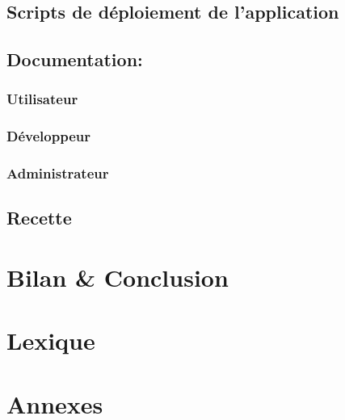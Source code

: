 \documentclass[11pt,a4paper]{report}
\begin{document}
	\section{Scripts de déploiement de l'application}
	\section{Documentation:}
		\subsection{Utilisateur}
		\subsection{Développeur}
		\subsection{Administrateur}
	\section{Recette}

\chapter{Bilan \& Conclusion}

\chapter*{Lexique}

\listoffigures
\listoftables

\chapter*{Annexes}
\end{document}
